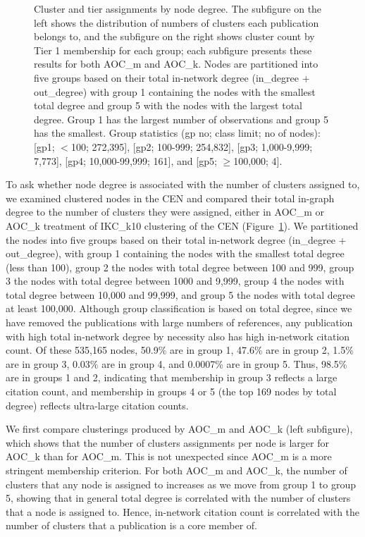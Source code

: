 \documentclass[12pt, oneside]{article}   	%
\begin{document}
\begin{figure}[H]
\begin{subfigure}[t]{0.48\textwidth}
		\end{subfigure}
		\captionsetup{width=0.9\textwidth}	
		\caption{Cluster and tier assignments by node degree. The subfigure on the left shows the distribution of numbers of clusters each publication belongs to, and the subfigure on the right shows cluster count by Tier 1 membership for each group; each subfigure presents these results for both AOC\_m and AOC\_k. Nodes are partitioned into five groups based on their total in-network degree (in\_degree + out\_degree) with group 1 containing the nodes with the smallest total degree and group 5 with the nodes with the largest total degree. Group 1 has the largest number of observations and group 5 has the smallest. Group statistics (gp no; class limit; no of nodes): [gp1; $<$100;  272,395], [gp2; 100-999; 254,832], [gp3; 1,000-9,999; 7,773], [gp4; 10,000-99,999; 161], and [gp5; $\geq$100,000; 4]. }
		\label{fig:fig3}
	\end{figure}
	
	
	To ask whether node degree is associated with the number of clusters assigned to, we examined clustered nodes in the CEN and compared their total in-graph degree to the number of clusters they were assigned, either in AOC\_m or AOC\_k treatment of IKC\_k10 clustering of the CEN (Figure~\ref{fig:fig3}). 
	We partitioned the nodes into five groups based on their total in-network degree (in\_degree + out\_degree),  with group 1 containing the nodes with the smallest total degree (less than 100), group 2 the nodes with total degree between 100 and 999, group 3 the nodes with total degree between 1000 and 9,999, 
	group 4 the nodes with total degree between 10,000 and 99,999, and group 5 the nodes with total degree at least 100,000.
	Although group classification is based on total degree, since we have removed the publications with large numbers of references, any publication with high total 
	in-network degree by necessity also has high  in-network citation count. 
	Of these 535,165 nodes, 50.9\% are  in group 1, 47.6\% are in group  2, 1.5\% are in group 3,  0.03\% are in group 4, and 0.0007\% are in group 5.
	Thus, 98.5\% are in groups 1 and 2, indicating that membership in group 3  reflects a large citation count, and membership
	in groups 4 or 5 (the top 169 nodes by total degree) reflects ultra-large citation counts.    
	
	
	
	
	We first compare clusterings produced by AOC\_m and AOC\_k (left subfigure), which shows that the number of clusters assignments per node is larger for AOC\_k than for AOC\_m. This is not unexpected since AOC\_m is a more stringent membership criterion. 
	For both AOC\_m and AOC\_k, the number of clusters that any node is assigned to increases as we move from group 1 to group 5, showing
	that in general total degree is correlated with the number of clusters that a node is assigned to.
	Hence, in-network citation count is correlated with the number of clusters that a publication is a core member of.
	
\end{document}
